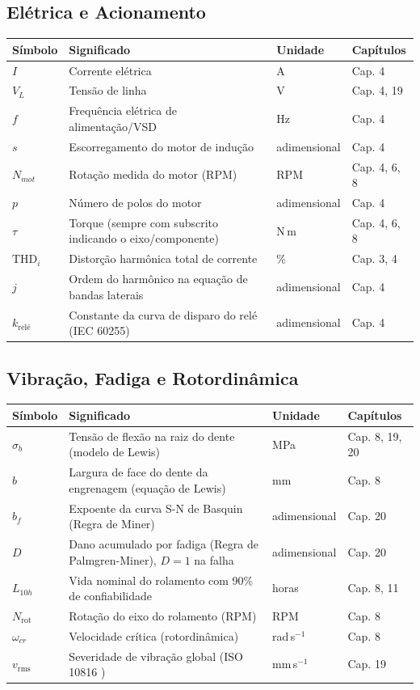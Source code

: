 \documentclass[12pt,a4paper]{article}
\numberwithin{equation}{section}
\numberwithin{table}{section}
\numberwithin{figure}{section}
\begin{document}
{\subsection*{Elétrica e Acionamento}
\begin{longtable}{|p{2.0cm}|p{6.1cm}|p{2.1cm}|p{4.2cm}|}
	\hline
	\textbf{Símbolo} & \textbf{Significado} & \textbf{Unidade} & \textbf{Capítulos} \\ \hline
	\endhead
	$I$ & Corrente elétrica & A & Cap. 4 \\ \hline
	$V_L$ & Tensão de linha & V & Cap. 4, 19 \\ \hline
	$f$ & Frequência elétrica de alimentação/VSD & Hz & Cap. 4 \\ \hline
	$s$ & Escorregamento do motor de indução & adimensional & Cap. 4 \\ \hline
	$N_{mot}$\dag & Rotação medida do motor (RPM) & RPM & Cap. 4, 6, 8 \\ \hline
	$p$ & Número de polos do motor & adimensional & Cap. 4 \\ \hline
	$\tau$ & Torque (sempre com subscrito indicando o eixo/componente) & N\,m & Cap. 4, 6, 8 \\ \hline
	$\text{THD}_i$ & Distorção harmônica total de corrente & \% & Cap. 3, 4 \\ \hline
	$j$\dag & Ordem do harmônico na equação de bandas laterais & adimensional & Cap. 4 \\ \hline
	$k_{\text{relé}}$\dag & Constante da curva de disparo do relé (IEC 60255) & adimensional & Cap. 4 \\ \hline
\end{longtable}

\subsection*{Vibração, Fadiga e Rotordinâmica}
\begin{longtable}{|p{2.0cm}|p{6.1cm}|p{2.1cm}|p{4.2cm}|}
	\hline
	\textbf{Símbolo} & \textbf{Significado} & \textbf{Unidade} & \textbf{Capítulos} \\ \hline
	\endhead
	$\sigma_b$ & Tensão de flexão na raiz do dente (modelo de Lewis) & MPa & Cap. 8, 19, 20 \\ \hline
	$b$ & Largura de face do dente da engrenagem (equação de Lewis) & mm & Cap. 8 \\ \hline
	$b_f$\dag & Expoente da curva S-N de Basquin (Regra de Miner) & adimensional & Cap. 20 \\ \hline
	$D$ & Dano acumulado por fadiga (Regra de Palmgren-Miner), $D=1$ na falha & adimensional & Cap. 20 \\ \hline
	$L_{10h}$ & Vida nominal do rolamento com 90\% de confiabilidade & horas & Cap. 8, 11 \\ \hline
	$N_{\text{rot}}$\dag & Rotação do eixo do rolamento (RPM) & RPM & Cap. 8 \\ \hline
	$\omega_{cr}$ & Velocidade crítica (rotordinâmica) & rad\,s$^{-1}$ & Cap. 8 \\ \hline
	$v_{\text{rms}}$ & Severidade de vibração global (ISO 10816 \cite{iso10816}) & mm\,s$^{-1}$ & Cap. 19 \\ \hline
\end{longtable}

}
\end{document}
